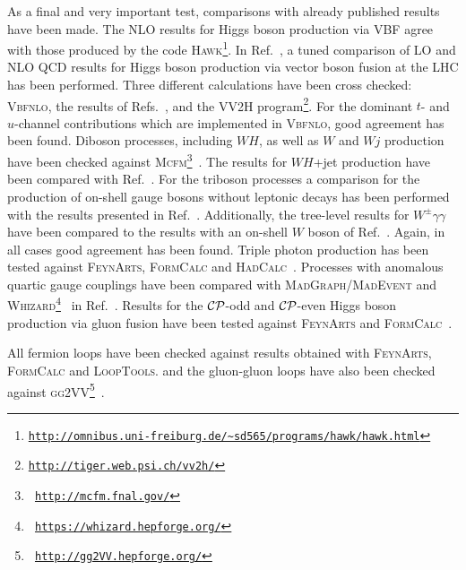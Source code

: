 \documentclass[english,12pt]{article}
\begin{document}
As a final and very important test, comparisons with already published results
have been made. The NLO results for Higgs boson production via VBF agree with those
produced by the code \textsc{Hawk}\footnote{
{\tt \href{http://omnibus.uni-freiburg.de/~sd565/programs/hawk/hawk.html}{http://omnibus.uni-freiburg.de/\~{}sd565/programs/hawk/hawk.html}}}.  In
Ref.~\cite{:2008uu}, a tuned comparison of LO and NLO QCD results for Higgs 
boson production via vector boson fusion at the LHC has been performed. Three
different calculations have been cross checked: \textsc{Vbfnlo}, the results of
Refs.~\cite{Ciccolini:2007jr,Ciccolini:2007ec}, and the \textsc{VV2H}
program\footnote{\tt \href{http://tiger.web.psi.ch/vv2h/}{http://tiger.web.psi.ch/vv2h/}}. For the dominant
$t$- and $u$-channel contributions which are implemented in \textsc{Vbfnlo},
good agreement has been found.  
Diboson processes, including $WH$, as well as $W$ and $Wj$ production have been
checked against \textsc{Mcfm}\footnote{{\tt
\href{http://mcfm.fnal.gov/}{http://mcfm.fnal.gov/}}}~\cite{Campbell:1999ah,Campbell:2011bn,Campbell:2011cu}.
The results for $WH$+jet production have been compared with Ref.~\cite{JiJuan:2010ga}.
For the triboson processes a comparison for the
production of on-shell gauge bosons without leptonic decays has been performed
with the results presented in Ref.~\cite{Binoth:2008kt}. Additionally,
the tree-level results for $W^\pm\gamma\gamma$ have been compared to the
results with an on-shell $W$ boson of Ref.~\cite{Baur:2010zf}. Again, in
all cases good agreement has been found.  Triple photon production has been tested against 
\textsc{FeynArts}, \textsc{FormCalc} and \textsc{HadCalc}~\cite{Hahn:1998yk,Hahn:2006qw,Rauch:2008fy}.
Processes with anomalous quartic gauge couplings have been compared with \textsc{MadGraph/MadEvent} and
\textsc{Whizard}\footnote{\tt
\href{https://whizard.hepforge.org/}{https://whizard.hepforge.org/}}~\cite{Kilian:2007gr}
in Ref.~\cite{Degrande:2013rea}.
Results for the $\cal{CP}$-odd and $\cal{CP}$-even Higgs boson production via gluon
fusion have been tested against
\textsc{FeynArts} and \textsc{FormCalc}~\cite{Hahn:2000kx,Hahn:2001rv}.  

All fermion loops have been checked against results obtained with \textsc{FeynArts}, \textsc{FormCalc} and \textsc{LoopTools}. 
and the gluon-gluon loops have also been checked against \textsc{gg2VV}\footnote{\tt 
\href{http://gg2VV.hepforge.org/}{http://gg2VV.hepforge.org/}}~\cite{Binoth:2008pr,Kauer:2012ma}.
\end{document}
